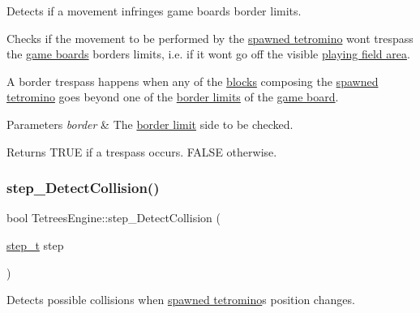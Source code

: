 Detects if a movement infringes game board\textquotesingle{}s border limits. 

Checks if the movement to be performed by the \hyperlink{classTetreesEngine_a26435ee2f02d9ba70d9e359745114f6e}{spawned tetromino} won\textquotesingle{}t trespass the \hyperlink{classTetreesEngine_a37d082a7816d6731b2703dd6d1a1cb97}{game board\textquotesingle{}s} borders limits, i.\+e. if it won\textquotesingle{}t go off the visible \hyperlink{TetreesUI_8cpp_af900bffe25b932fb86dc61cfdf839e95}{playing field area}.

A border trespass happens when any of the \hyperlink{TetreesDefs_8hpp_ad8f0654cf997b7ea7eb14924d0b1ea33}{blocks} composing the \hyperlink{classTetreesEngine_a26435ee2f02d9ba70d9e359745114f6e}{spawned tetromino} goes beyond one of the \hyperlink{TetreesDefs_8hpp_a5dbb1ebfe8a9b95707ac161d3549ed8a}{border limits} of the \hyperlink{classTetreesEngine_a37d082a7816d6731b2703dd6d1a1cb97}{game board}. 
\begin{DoxyParams}{Parameters}
{\em border} & The \hyperlink{TetreesDefs_8hpp_a5dbb1ebfe8a9b95707ac161d3549ed8a}{border limit} side to be checked. \\
\hline
\end{DoxyParams}
\begin{DoxyReturn}{Returns}
{\ttfamily T\+R\+UE} if a trespass occurs. {\ttfamily F\+A\+L\+SE} otherwise. 
\end{DoxyReturn}
\mbox{\label{classTetreesEngine_a25f8b896240ce2d2a34b1d968e75b5b6}} 
\subsubsection{\texorpdfstring{step\+\_\+\+Detect\+Collision()}{step\_DetectCollision()}}
{\footnotesize\ttfamily bool Tetrees\+Engine\+::step\+\_\+\+Detect\+Collision (\begin{DoxyParamCaption}\item[{\hyperlink{TetreesDefs_8hpp_a4d5a793092a473f85b4c1f7faf62afed}{step\+\_\+t}}]{step }\end{DoxyParamCaption})\hspace{0.3cm}{\ttfamily [private]}}



Detects possible collisions when \hyperlink{classTetreesEngine_a26435ee2f02d9ba70d9e359745114f6e}{spawned tetromino}\textquotesingle{}s position changes. 

